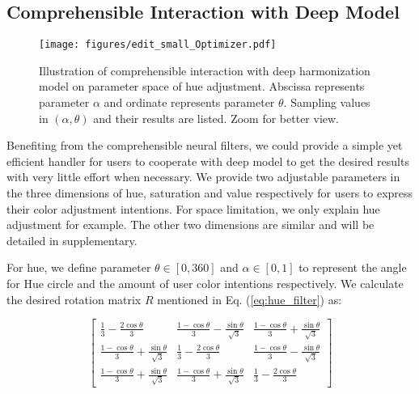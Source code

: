 \documentclass[runningheads]{llncs}
\begin{document}
    
    
    \subsection{Comprehensible Interaction with Deep Model}
    
    \begin{figure}[!thb]
    \centering
    \texttt{[image: figures/edit\_small\_Optimizer.pdf]}
    \caption{Illustration of comprehensible interaction with deep harmonization model on parameter space of hue adjustment.
    Abscissa represents parameter $\alpha$ and ordinate represents parameter $\theta$.
    Sampling values in $(\alpha, \theta)$ and their results are listed.
    Zoom for better view.
    }
    \vspace{-20pt}
    \label{fig:edit_filter}
    \end{figure}
    
     Benefiting from the comprehensible neural filters, we could provide a simple yet efficient handler for users to cooperate with deep model to get the desired results with very little effort when necessary.
    We provide two adjustable parameters 
    in the three dimensions of hue, saturation and value respectively for users to express their color adjustment intentions.
    For space limitation, we only explain hue adjustment for example.
    The other two dimensions are similar and will be detailed in supplementary.
    
    For hue, we define parameter $\theta \in [0,360]$ and $\alpha \in [0,1]$ to represent the angle for Hue circle and the amount of user color intentions respectively.
    We calculate the desired rotation matrix $R$ mentioned in Eq. (\ref{eq:hue_filter}) as:
    
    
    \begin{equation}
    \label{eq:rotation}
    \begin{bmatrix}
    \frac{1}{3}-\frac{2\cos\theta}{3} & \frac{1-\cos\theta}{3} - \frac{\sin\theta}{\sqrt{3}} & 
    \frac{1-\cos\theta}{3} + \frac{\sin\theta}{\sqrt{3}}
    \\
    \frac{1-\cos\theta}{3} + \frac{\sin\theta}{\sqrt{3}} & \frac{1}{3}-\frac{2\cos\theta}{3} & 
    \frac{1-\cos\theta}{3} - \frac{\sin\theta}{\sqrt{3}}
    \\
    \frac{1-\cos\theta}{3} + \frac{\sin\theta}{\sqrt{3}} & \frac{1-\cos\theta}{3} + \frac{\sin\theta}{\sqrt{3}} & \frac{1}{3}-\frac{2\cos\theta}{3} 
    \end{bmatrix}
    \end{equation}
    
\end{document}
